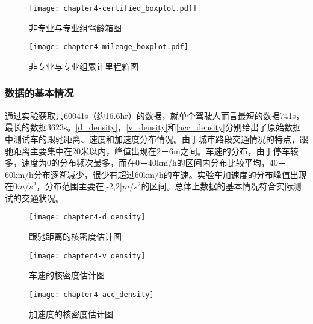 \begin{figure}
\begin{minipage}[t]{0.48\linewidth}
\centering
\texttt{[image: chapter4-certified\_boxplot.pdf]}
\caption{非专业与专业组驾龄箱图}
\label{certified_boxplot}
\end{minipage}%
\hspace*{0.04\linewidth}
\begin{minipage}[t]{0.48\linewidth}
\centering
\texttt{[image: chapter4-mileage\_boxplot.pdf]}
\caption{非专业与专业组累计里程箱图}
\label{mileage_boxplot}
\end{minipage}
\end{figure}




\subsubsection{数据的基本情况}

通过实验获取共60041s（约16.6hr）的数据，就单个驾驶人而言最短的数据741s，最长的数据3623s。\autoref{d_density}，\autoref{v_density}和\autoref{acc_density}分别给出了原始数据中测试车的跟驰距离、速度和加速度分布情况。由于城市路段交通情况的特点，跟驰距离主要集中在20米以内，峰值出现在2－6m之间。车速的分布，由于停车较多，速度为0的分布频次最多，而在0－40km/h的区间内分布比较平均，40－60km/h分布逐渐减少，很少有超过60km/h的车速。实验车加速度的分布峰值出现在0$m/s^2$，分布范围主要在[-2,2]$m/s^2$的区间。总体上数据的基本情况符合实际测试的交通状况。





\begin{figure}[htbp]
\begin{minipage}[t]{0.3\linewidth}
\centering
\texttt{[image: chapter4-d\_density]}
\caption{跟驰距离的核密度估计图}
\label{d_density}
\end{minipage}%
\hspace*{0.05\linewidth}
\begin{minipage}[t]{0.3\linewidth}
\centering
\texttt{[image: chapter4-v\_density]}
\caption{车速的核密度估计图}
\label{v_density}
\end{minipage}
\hspace*{0.05\linewidth}
\centering
\texttt{[image: chapter4-acc\_density]}
\caption{加速度的核密度估计图}
\label{acc_density}
\end{figure}







